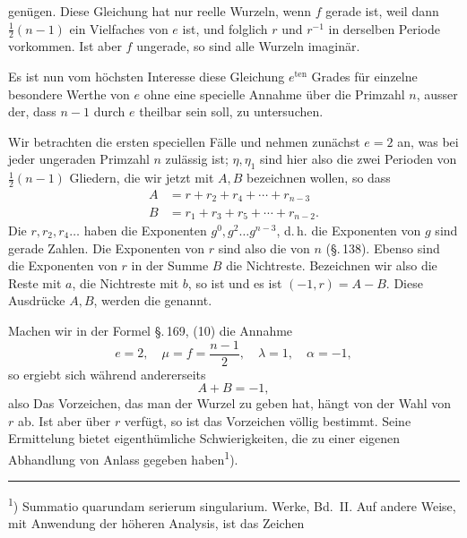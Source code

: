 
gen\"ugen. Diese Gleichung hat nur reelle Wurzeln, wenn $f$ gerade ist, weil dann $\tfrac{1}{2}(n - 1)$ ein Vielfaches von $e$ ist, und folglich $r$ und $r^{-1}$ in derselben Periode vorkommen. Ist aber $f$ ungerade, so sind alle Wurzeln imagin\"ar.

Es ist nun vom h\"ochsten Interesse diese Gleichung $e^{\text{ten}}$ Grades f\"ur einzelne besondere Werthe von $e$ ohne eine specielle Annahme \"uber die Primzahl $n$, ausser der, dass $n - 1$ durch $e$ theilbar sein soll, zu untersuchen.

Wir betrachten die ersten speciellen F\"alle und nehmen zun\"achst $e = 2$ an, was bei jeder ungeraden Primzahl $n$ zul\"assig ist; $\eta, \eta_1$ sind hier also die zwei Perioden von $\tfrac{1}{2}(n - 1)$ Gliedern, die wir jetzt mit $A, B$ bezeichnen wollen, so dass
\[
\begin{aligned}
A &= r + r_2 + r_4 + \cdots + r_{n-3}\\
B &= r_1 + r_3 + r_5 + \cdots + r_{n-2}.
\end{aligned}
\]
Die $r, r_2, r_4 \ldots$ haben die Exponenten $g^0, g^2 \ldots g^{n-3}$, d.\,h. die Exponenten von $g$ sind gerade Zahlen. Die Exponenten von $r$ sind also die  von $n$ (\S.\,138). Ebenso sind die Exponenten von $r$ in der Summe $B$ die Nichtreste. Bezeichnen wir also die Reste mit $a$, die Nichtreste mit $b$, so ist
und es ist $(-1, r) = A - B$. Diese Ausdr\"ucke $A, B$, werden die  genannt.

Machen wir in der Formel \S.\,169, (10) die Annahme
\[
e = 2, \quad \mu = f = \frac{n-1}{2}, \quad \lambda = 1, \quad \alpha = -1,
\]
so ergiebt sich
w\"ahrend andererseits
\[
A + B = -1,
\]
also
Das Vorzeichen, das man der Wurzel zu geben hat, h\"angt von der Wahl von $r$ ab. Ist aber \"uber $r$ verf\"ugt, so ist das Vorzeichen v\"ollig bestimmt. Seine Ermittelung bietet eigenth\"umliche Schwierigkeiten, die zu einer eigenen Abhandlung von  Anlass gegeben haben\textsuperscript{1}).

\noindent\rule{3cm}{0.4pt}

\noindent\textsuperscript{1}) Summatio quarundam serierum singularium.  Werke, Bd.\ II. Auf andere Weise, mit Anwendung der h\"oheren Analysis, ist das Zeichen
